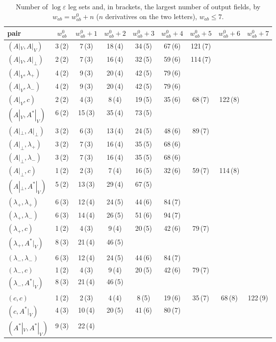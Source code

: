 \documentclass[11pt]{article}
\numberwithin{equation}{section}
\theoremstyle{plain}
\theoremstyle{definition}
\begin{document}
\begin{table}[h]
\centering\scriptsize
\begin{tabular}{l|cccccccc}
pair & $w^0_{ab}$ & $w^0_{ab}+1$ & $w^0_{ab}+2$ & $w^0_{ab}+3$ & $w^0_{ab}+4$ & $w^0_{ab}+5$ & $w^0_{ab}+6$ & $w^0_{ab}+7$\\\hline
$(A|_V,A|_V)$ & 3\,(2) & 7\,(3) & 18\,(4) & 34\,(5) & 67\,(6) & 121\,(7) &  & \\
$(A|_V,A|_\perp)$ & 2\,(2) & 7\,(3) & 16\,(4) & 32\,(5) & 59\,(6) & 114\,(7) &  & \\
$(A|_V,\lambda_+)$ & 4\,(2) & 9\,(3) & 20\,(4) & 42\,(5) & 79\,(6) &  &  & \\
$(A|_V,\lambda_-)$ & 4\,(2) & 9\,(3) & 20\,(4) & 42\,(5) & 79\,(6) &  &  & \\
$(A|_V,c)$ & 2\,(2) & 4\,(3) & 8\,(4) & 19\,(5) & 35\,(6) & 68\,(7) & 122\,(8) & \\
$(A|_V,A^*|_V)$ & 6\,(2) & 15\,(3) & 35\,(4) & 73\,(5) &  &  &  & \\
$(A|_\perp,A|_\perp)$ & 3\,(2) & 6\,(3) & 13\,(4) & 24\,(5) & 48\,(6) & 89\,(7) &  & \\
$(A|_\perp,\lambda_+)$ & 3\,(2) & 7\,(3) & 16\,(4) & 35\,(5) & 68\,(6) &  &  & \\
$(A|_\perp,\lambda_-)$ & 3\,(2) & 7\,(3) & 16\,(4) & 35\,(5) & 68\,(6) &  &  & \\
$(A|_\perp,c)$ & 1\,(2) & 2\,(3) & 7\,(4) & 16\,(5) & 32\,(6) & 59\,(7) & 114\,(8) & \\
$(A|_\perp,A^*|_V)$ & 5\,(2) & 13\,(3) & 29\,(4) & 67\,(5) &  &  &  & \\
$(\lambda_+,\lambda_+)$ & 6\,(3) & 12\,(4) & 24\,(5) & 44\,(6) & 84\,(7) &  &  & \\
$(\lambda_+,\lambda_-)$ & 6\,(3) & 14\,(4) & 26\,(5) & 51\,(6) & 94\,(7) &  &  & \\
$(\lambda_+,c)$ & 1\,(2) & 4\,(3) & 9\,(4) & 20\,(5) & 42\,(6) & 79\,(7) &  & \\
$(\lambda_+,A^*|_V)$ & 8\,(3) & 21\,(4) & 46\,(5) &  &  &  &  & \\
$(\lambda_-,\lambda_-)$ & 6\,(3) & 12\,(4) & 24\,(5) & 44\,(6) & 84\,(7) &  &  & \\
$(\lambda_-,c)$ & 1\,(2) & 4\,(3) & 9\,(4) & 20\,(5) & 42\,(6) & 79\,(7) &  & \\
$(\lambda_-,A^*|_V)$ & 8\,(3) & 21\,(4) & 46\,(5) &  &  &  &  & \\
$(c,c)$ & 1\,(2) & 2\,(3) & 4\,(4) & 8\,(5) & 19\,(6) & 35\,(7) & 68\,(8) & 122\,(9)\\
$(c,A^*|_V)$ & 4\,(3) & 10\,(4) & 20\,(5) & 41\,(6) & 80\,(7) &  &  & \\
$(A^*|_V,A^*|_V)$ & 9\,(3) & 22\,(4) &  &  &  &  &  & \\
\end{tabular}
\caption{Number of $\log\varepsilon$ leg sets and, in brackets, the largest number of output fields, by $w_{ab}=w^0_{ab}+n$ ($n$ derivatives on the two letters), $w_{ab}\le7$.}
\label{tab:tl-B}
\end{table}
\end{document}
